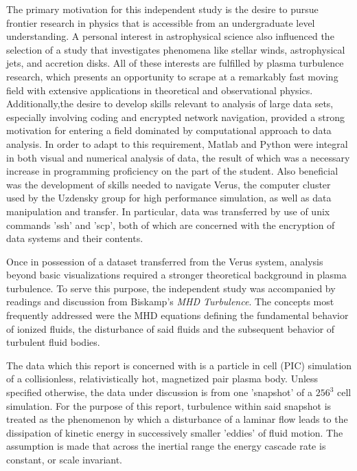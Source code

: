 \documentclass[journal, a4paper]{IEEEtran}
\begin{document}
The primary motivation for this independent study is the desire to pursue frontier research in physics that is accessible from an undergraduate level understanding. A personal interest in astrophysical science also influenced the selection of a study that investigates phenomena like stellar winds, astrophysical jets, and accretion disks. All of these interests are fulfilled by plasma turbulence research, which presents an opportunity to scrape at a remarkably fast moving field with extensive applications in theoretical and observational physics. Additionally,the desire to develop skills relevant to analysis of large data sets, especially involving coding and encrypted network navigation, provided a strong motivation for entering a field dominated by computational approach to data analysis. In order to adapt to this requirement, Matlab and Python were integral in both visual and numerical analysis of data, the result of which was a necessary increase in programming proficiency on the part of the student. Also beneficial was the development of skills needed to navigate Verus, the computer cluster used by the Uzdensky group for high performance simulation, as well as data manipulation and transfer. In particular, data was transferred by use of unix commands 'ssh' and 'scp', both of which are concerned with the encryption of data systems and their contents.

Once in possession of a dataset transferred from the Verus system, analysis beyond basic visualizations required a stronger theoretical background in plasma turbulence. To serve this purpose, the independent study was accompanied by readings and discussion from Biskamp’s \textit{MHD Turbulence}\cite{biskamp}. The concepts most frequently addressed were the MHD equations defining the fundamental behavior of ionized fluids, the disturbance of said fluids and the subsequent behavior of turbulent fluid bodies.

The data which this report is concerned with is a particle in cell (PIC) simulation of a collisionless, relativistically hot, magnetized pair plasma body. Unless specified otherwise, the data under discussion is from one 'snapshot' of a $256^3$ cell simulation\cite{zhdankin}. For the purpose of this report, turbulence within said snapshot is treated as the phenomenon by which a disturbance of a laminar flow leads to the dissipation of kinetic energy in successively smaller 'eddies' of fluid motion. The assumption is made that across the inertial range the energy cascade rate is constant, or scale invariant.
\end{document}
